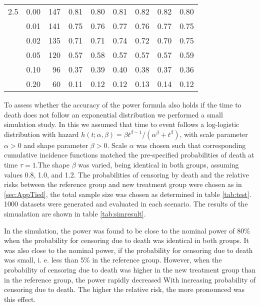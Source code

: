 \documentclass[bimj,fleqn]{w-art}\usepackage[]{graphicx}\usepackage[]{color}
\theoremstyle{plain}
\theoremstyle{definition}
\begin{document}
\begin{table}[ht]
\begin{tabular}{lrrrrrrrr}
  2.5 & 0.00 & 147 & 0.81 & 0.80 & 0.81 & 0.82 & 0.82 & 0.80 \\ 
    & 0.01 & 141 & 0.75 & 0.76 & 0.77 & 0.76 & 0.77 & 0.75 \\ 
    & 0.02 & 135 & 0.71 & 0.71 & 0.74 & 0.72 & 0.70 & 0.75 \\ 
    & 0.05 & 120 & 0.57 & 0.58 & 0.57 & 0.57 & 0.57 & 0.59 \\ 
    & 0.10 & 96 & 0.37 & 0.39 & 0.40 & 0.38 & 0.37 & 0.36 \\ 
    & 0.20 & 60 & 0.11 & 0.12 & 0.12 & 0.13 & 0.14 & 0.12 \\ 
   \hline
\end{tabular}
\end{table}



To assess whether the accuracy of the power formula also holds if the time to
death does not follow an exponential distribution we performed a small simulation
study. In this we assumed that time to event follows a log-logistic distribution
with hazard $h(t; \alpha, \beta) = \beta t^{\beta - 1} / (\alpha^{\beta} + t^{\beta})$,
with scale parameter $\alpha > 0 $ and shape parameter $\beta > 0$. Scale $\alpha$ was
chosen such that corresponding cumulative incidence functions matched the
pre-specified probabilities of death at time $\tau = 1$.The shape $\beta$ was
varied, being identical in both groups, assuming values 0.8, 1.0, and 1.2.
The probabilities of censoring by death and the relative risks between the
reference group and new treatment group were chosen as in \ref{sec:AppTied}, the
total sample size was chosen as determined in table \ref{tab:test}. 1000 datasets
were generated and evaluated in each scenario. The results of the simualation
are shown in table \ref{tab:simresult}.

In the simulation, the power was found to be close to the nominal power of 80\%
when the probability for censoring due to death was identical in both groups.
It was also close to the nominal power, if the probability for censoring due to
death was small, i. e. less than 5\% in the reference group. However, when the
probability of censoring due to death was higher in the new treatment group than
in the reference group, the power rapidly decreased With increasing probability
of censoring due to death. The higher the relative risk, the more pronounced was
this effect.
\end{document}
